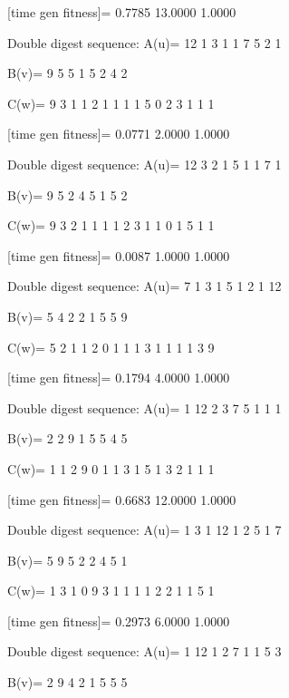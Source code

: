 [time gen fitness]=
    0.7785   13.0000    1.0000

Double digest sequence:
A(u)=
    12     1     3     1     1     7     5     2     1

B(v)=
     9     5     5     1     5     2     4     2

C(w)=
     9     3     1     1     2     1     1     1     1     5     0     2     3     1     1     1

[time gen fitness]=
    0.0771    2.0000    1.0000

Double digest sequence:
A(u)=
    12     3     2     1     5     1     1     7     1

B(v)=
     9     5     2     4     5     1     5     2

C(w)=
     9     3     2     1     1     1     1     2     3     1     1     0     1     5     1     1

[time gen fitness]=
    0.0087    1.0000    1.0000

Double digest sequence:
A(u)=
     7     1     3     1     5     1     2     1    12

B(v)=
     5     4     2     2     1     5     5     9

C(w)=
     5     2     1     1     2     0     1     1     1     3     1     1     1     1     3     9

[time gen fitness]=
    0.1794    4.0000    1.0000

Double digest sequence:
A(u)=
     1    12     2     3     7     5     1     1     1

B(v)=
     2     2     9     1     5     5     4     5

C(w)=
     1     1     2     9     0     1     1     3     1     5     1     3     2     1     1     1

[time gen fitness]=
    0.6683   12.0000    1.0000

Double digest sequence:
A(u)=
     1     3     1    12     1     2     5     1     7

B(v)=
     5     9     5     2     2     4     5     1

C(w)=
     1     3     1     0     9     3     1     1     1     1     2     2     1     1     5     1

[time gen fitness]=
    0.2973    6.0000    1.0000

Double digest sequence:
A(u)=
     1    12     1     2     7     1     1     5     3

B(v)=
     2     9     4     2     1     5     5     5

